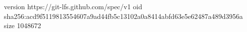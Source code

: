 version https://git-lfs.github.com/spec/v1
oid sha256:acd9f5119813554607a9ad44fb5c13102a0a8414abfd63e5e62487a489d3956a
size 1048672
